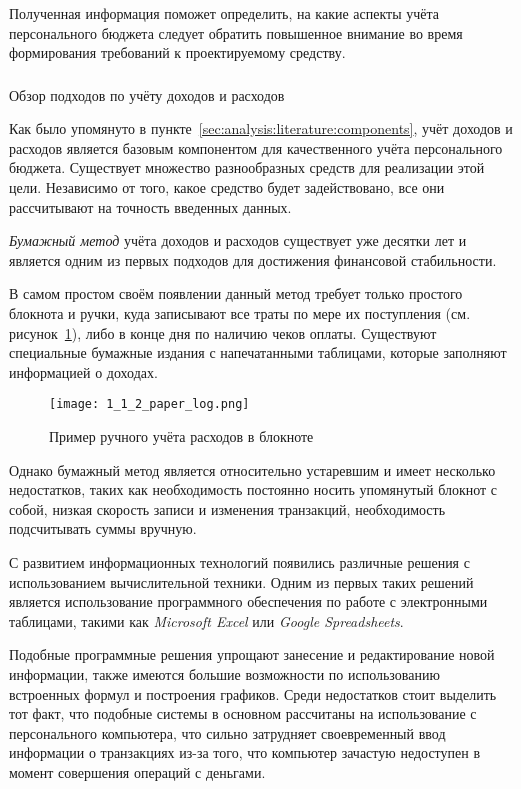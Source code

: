 Полученная информация поможет определить, на какие аспекты учёта персонального бюджета следует обратить повышенное внимание во время формирования требований к проектируемому средству.

\subsubsection{} Обзор подходов по учёту доходов и расходов
\label{sec:analysis:literature:tracking}

Как было упомянуто в пункте~\ref{sec:analysis:literature:components}, учёт доходов и расходов является базовым компонентом для качественного учёта персонального бюджета.
Существует множество разнообразных средств для реализации этой цели.
Независимо от того, какое средство будет задействовано, все они рассчитывают на точность введенных данных.

\emph{Бумажный метод} учёта доходов и расходов существует уже десятки лет и является одним из первых подходов для достижения финансовой стабильности.

В самом простом своём появлении данный метод требует только простого блокнота и ручки, куда записывают все траты по мере их поступления (см. рисунок~\ref{fig:analysis:literature:paper_log}), либо в конце дня по наличию чеков оплаты.
Существуют специальные бумажные издания с напечатанными таблицами, которые заполняют информацией о доходах.

\begin{figure}[H]
    \centering
    \texttt{[image: 1\_1\_2\_paper\_log.png]}
    \caption{Пример ручного учёта расходов в блокноте}
    \label{fig:analysis:literature:paper_log}
\end{figure}

Однако бумажный метод является относительно устаревшим и имеет несколько недостатков, таких как необходимость постоянно носить упомянутый блокнот с собой, низкая скорость записи и изменения транзакций, необходимость подсчитывать суммы вручную.

С развитием информационных технологий появились различные решения с использованием вычислительной техники.
Одним из первых таких решений является использование программного обеспечения по работе с электронными таблицами, такими как \emph{Microsoft Excel} или \emph{Google Spreadsheets}.

Подобные программные решения упрощают занесение и редактирование новой информации, также имеются большие возможности по использованию встроенных формул и построения графиков.
Среди недостатков стоит выделить тот факт, что подобные системы в основном рассчитаны на использование с персонального компьютера, что сильно затрудняет своевременный ввод информации о транзакциях из-за того, что компьютер зачастую недоступен в момент совершения операций с деньгами.

